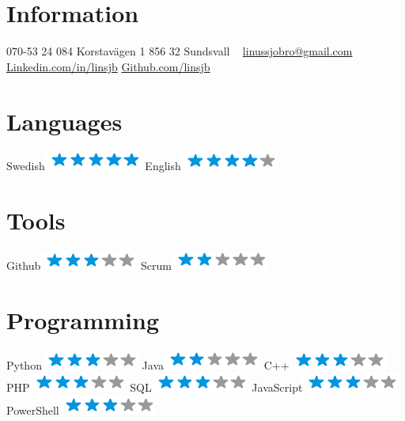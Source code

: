\begin{aside}
    \section{Information}
      070-53 24 084
      Korstavägen 1
      856 32 Sundsvall
      ~
      \href{mailto:linussjobro@gmail.com}{linussjobro@gmail.com}
      \href{https://www.linkedin.com/in/linsjb}{Linkedin.com/in/linsjb}
      \href{https://github.com/linsjb}{Github.com/linsjb}
    \section{Languages}
      Swedish\includegraphics[scale=0.40]{img/5stars.png}
      English\includegraphics[scale=0.40]{img/4stars.png}
    \section{Tools}
      Github\includegraphics[scale=0.40]{img/3stars.png}
      Scrum\includegraphics[scale=0.40]{img/2stars.png}
    \section{Programming}
      Python\includegraphics[scale=0.40]{img/3stars.png}
      Java\includegraphics[scale=0.40]{img/2stars.png}
      C++\includegraphics[scale=0.40]{img/3stars.png}
      PHP\includegraphics[scale=0.40]{img/3stars.png}
      SQL\includegraphics[scale=0.40]{img/3stars.png}
      JavaScript\includegraphics[scale=0.40]{img/3stars.png}
      PowerShell\includegraphics[scale=0.40]{img/3stars.png}

\end{aside}
